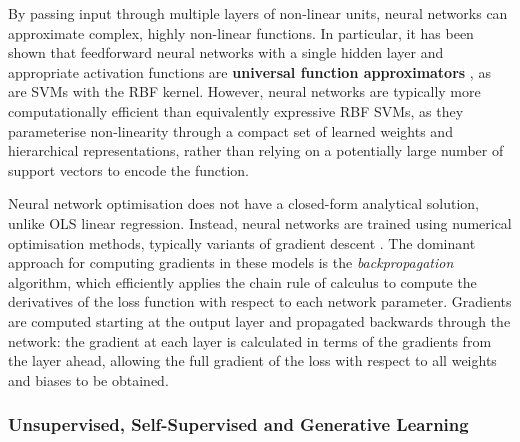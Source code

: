 \documentclass{report}
\begin{document}
By passing input through multiple layers of non-linear units, neural networks can approximate complex, highly non-linear functions. In particular, it has been shown that feedforward neural networks with a single hidden layer and appropriate activation functions are \textbf{universal function approximators} \cite{cybenko1989approximation}, as are SVMs with the RBF kernel. However, neural networks are typically more computationally efficient than equivalently expressive RBF SVMs, as they parameterise non-linearity through a compact set of learned weights and hierarchical representations, rather than relying on a potentially large number of support vectors to encode the function.

Neural network optimisation does not have a closed-form analytical solution, unlike OLS linear regression. Instead, neural networks are trained using numerical optimisation methods, typically variants of gradient descent \cite{goodfellow2016deep}. The dominant approach for computing gradients in these models is the \textit{backpropagation} algorithm, which efficiently applies the chain rule of calculus to compute the derivatives of the loss function with respect to each network parameter. Gradients are computed starting at the output layer and propagated backwards through the network: the gradient at each layer is calculated in terms of the gradients from the layer ahead, allowing the full gradient of the loss with respect to all weights and biases to be obtained.


\subsubsection{Unsupervised, Self-Supervised and Generative Learning}
\end{document}

